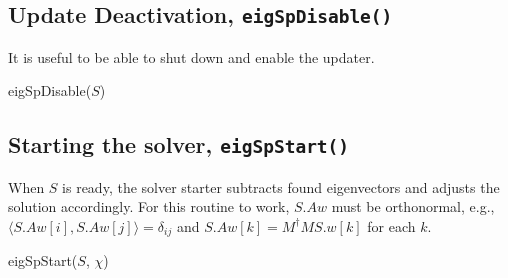 \documentclass[oneside,openright]{report}
\newcommand{\DontPrintSemicolon}{\dontprintsemicolon}
\begin{document}
\subsection{Update Deactivation, \texttt{eigSpDisable()}}
It is useful to be able to shut down and enable the updater.
\begin{function}
\DontPrintSemicolon
{}
\caption{eigSpDisable($S$)}
\end{function}

\subsection{Starting the solver, \texttt{eigSpStart()}}
When $S$ is ready, the solver starter subtracts found eigenvectors and adjusts
the solution accordingly. For this routine to work, $S.Aw$ must be orthonormal, e.g.,
$\langle S.Aw[i], S.Aw[j]\rangle=\delta_{ij}$ and
$S.Aw[k]=M^\dagger M S.w[k]$ for each $k$.
\begin{function}
\DontPrintSemicolon
{}
\caption{eigSpStart($S$, $\chi$)}
\end{function}
\end{document}
